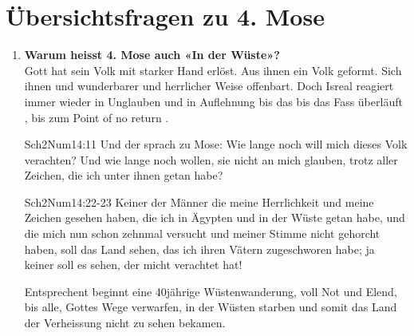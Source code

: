 \section{Übersichtsfragen zu 4. Mose}
\begin{enumerate}
    \item \textbf{Warum heisst 4. Mose auch «In der Wüste»?}\\
    Gott hat sein Volk mit starker Hand erlöst. Aus ihnen ein Volk geformt. Sich ihnen und wunderbarer und herrlicher Weise offenbart. Doch Isreal reagiert immer wieder in Unglauben und in Auflehnung bis das \flqq bis das Fass überläuft \frqq, bis zum \flqq Point of no return \frqq.
    \begin{bibeltext}{Sch2}{Num}{14:11}
        Und der \herr sprach zu Mose: Wie lange noch will mich dieses Volk verachten? Und wie lange noch wollen, sie nicht an mich glauben, trotz aller Zeichen, die ich unter ihnen getan habe?
    \end{bibeltext}
    \begin{bibeltext}{Sch2}{Num}{14:22-23}
        Keiner der Männer die meine Herrlichkeit und meine Zeichen gesehen haben, die ich in Ägypten und in der Wüste getan habe, und die mich nun schon zehnmal versucht und meiner Stimme nicht gehorcht haben, soll das Land sehen, das ich ihren Vätern zugeschworen habe; ja keiner soll es sehen, der micht verachtet hat!
    \end{bibeltext}
    Entsprechent beginnt eine 40jährige Wüstenwanderung, voll Not und Elend, bis alle, Gottes Wege verwarfen, in der Wüsten starben und somit das Land der Verheissung nicht zu sehen bekamen.
\end{enumerate}